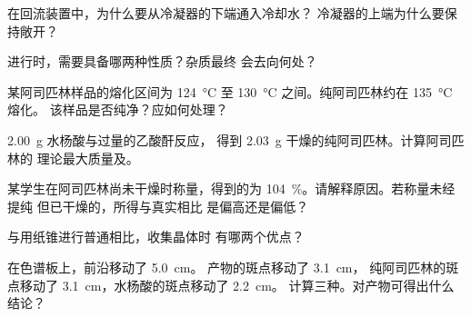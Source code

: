 \begin{exercise}[$\star$]\label{exo:g10:synthesis-yield:3}
在回流装置中，为什么要从冷凝器的下端通入冷却水？
冷凝器的上端为什么要保持敞开？
\end{exercise}

\begin{exercise}[$\star$]\label{exo:g10:synthesis-yield:4}
进行时，需要具备哪两种性质？杂质最终
会去向何处？
\end{exercise}

\begin{exercise}[$\star$]\label{exo:g10:synthesis-yield:5}
某阿司匹林样品的熔化区间为 \qty{124}{\celsius} 至
\qty{130}{\celsius} 之间。纯阿司匹林约在 \qty{135}{\celsius} 熔化。
该样品是否纯净？应如何处理？
\end{exercise}

\begin{exercise}[$\star\star$]\label{exo:g10:synthesis-yield:6}
\qty{2.00}{g} 水杨酸与过量的乙酸酐反应，
得到 \qty{2.03}{g} 干燥的纯阿司匹林。计算阿司匹林的
理论最大质量及。
\end{exercise}

\begin{exercise}[$\star\star$]\label{exo:g10:synthesis-yield:7}
某学生在阿司匹林尚未干燥时称量，得到的为
\qty{104}{\percent}。请解释原因。若称量未经提纯
但已干燥的，所得与真实相比
是偏高还是偏低？
\end{exercise}

\begin{exercise}[$\star\star$]\label{exo:g10:synthesis-yield:8}
与用纸锥进行普通相比，收集晶体时
有哪两个优点？
\end{exercise}

\begin{exercise}[$\star\star$]\label{exo:g10:synthesis-yield:9}
在色谱板上，前沿移动了 \qty{5.0}{cm}。
产物的斑点移动了 \qty{3.1}{cm}，
纯阿司匹林的斑点移动了 \qty{3.1}{cm}，水杨酸的斑点移动了 \qty{2.2}{cm}。
计算三种。对产物可得出什么结论？
\end{exercise}


